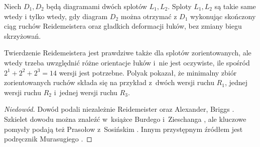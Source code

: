 \begin{theorem}[Reidemeister, 1927]
\label{thm:reidemeister}%
%
%
    Niech $D_1, D_2$ będą diagramami dwóch splotów $L_1, L_2$.
    Sploty $L_1, L_2$ są takie same wtedy i tylko wtedy, gdy diagram $D_2$ można otrzymać z $D_1$ wykonując skończony ciąg ruchów Reidemeistera oraz gładkich deformacji łuków, bez zmiany biegu skrzyżowań.
\end{theorem}

Twierdzenie Reidemeistera jest prawdziwe także dla splotów zorientowanych, ale wtedy trzeba uwzględnić różne orientacje łuków i~nie jest oczywiste, ile spośród $2^1 + 2^2 + 2^3 = 14$ wersji jest potrzebne.
Polyak \cite{polyak2010} pokazał, że minimalny zbiór zorientowanych ruchów składa się na przykład z~dwóch wersji ruchu $R_1$, jednej wersji ruchu $R_2$ i~jednej wersji ruchu $R_3$.
%

\begin{proof}[Niedowód]
Dowód podali niezależnie Reidemeister \cite{reidemeister1927} oraz Alexander, Briggs \cite{alexander1927}.
%
%
%
    Szkielet dowodu można znaleźć w~książce Burdego i~Zieschanga \cite[s. 9-11]{burde2014}, ale kluczowe pomysły podają też Prasołow z~Sosińskim \cite[s. 11-12]{prasolov1997}.
%
%
%
%
    Innym przystępnym źródłem jest podręcznik Murasugiego \cite[s. 50-56]{murasugi1996}.
%
\end{proof}



